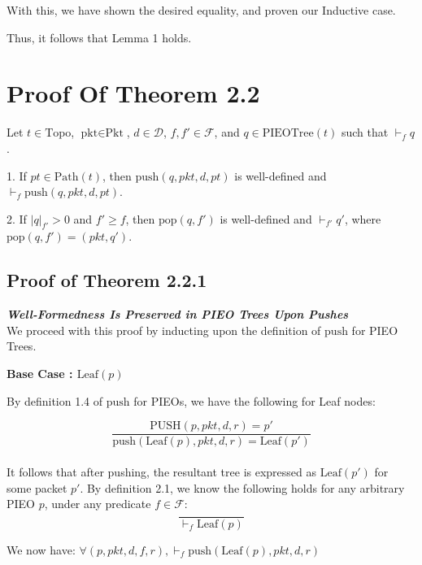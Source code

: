 \documentclass{amsart}
\begin{document}
With this, we have shown the desired equality, and proven our Inductive case.\newline

Thus, it follows that Lemma 1 holds.\newline

\newpage

\section{Proof Of Theorem 2.2}

Let $t \in \text{Topo}$, $\text{pkt} \in \text{Pkt}$, $d \in \mathcal{D}$, $f,f' \in \mathcal{F}$, and $q \in \text{PIEOTree}(t)$ such that $\vdash_f q$.\newline

1. If $pt \in \text{Path}(t)$, then $\text{push}(q, pkt, d, pt)$ is well-defined and $\vdash_f \text{push}(q, pkt, d, pt)$.\newline

2. If $|q|_{f'} > 0$ and $f' \geq f$, then $\text{pop}(q, f')$ is well-defined and $\vdash_{f'} q'$, where $\text{pop}(q, f') = (pkt, q')$.

\subsection{Proof of Theorem 2.2.1}
\textit{\textbf{Well-Formedness Is Preserved in PIEO Trees Upon Pushes}}\\[10pt]

We proceed with this proof by inducting upon the definition of $\text{push}$ for PIEO Trees.\newline

\textbf{Base Case : $\text{Leaf}(p)$}\newline

By definition 1.4 of $\text{push}$ for PIEOs, we have the following for Leaf nodes:

$$\frac{\text{PUSH}(p, pkt, d, r) = p'}{\text{push}(\text{Leaf}(p), pkt, d, r) = \text{Leaf}(p')}$$\\[-10pt]

It follows that after pushing, the resultant tree is expressed as $\text{Leaf}(p')$ for some packet $p'$. By definition 2.1, we know the following holds for any arbitrary PIEO $p$, under any predicate $f \in \mathcal{F}$:\\[-10pt]

$$\frac{}{\vdash_f \text{Leaf}(p)}$$

We now have: $\forall (p, pkt, d, f, r), \vdash_f \text{push}(\text{Leaf}(p), pkt, d, r)$\newline
\end{document}
